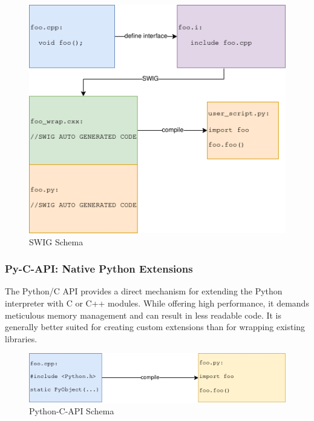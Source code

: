 \begin{figure}[htpb]
    \centering
    \includegraphics[width=\textwidth]{figures/swig_schema.png}
    \caption{SWIG Schema}
    \label{fig:swig-schema}
\end{figure}

\subsubsection{Py-C-API: Native Python Extensions}

The Python/C API provides a direct mechanism for extending the Python interpreter with C or C++ modules. While offering high performance, it demands meticulous memory management and can result in less readable code. It is generally better suited for creating custom extensions than for wrapping existing libraries. \cite{py-c-api}

\begin{figure}[htpb]
    \centering
    \includegraphics[width=\textwidth]{figures/python-C-API_schema.png}
    \caption{Python-C-API Schema}
    \label{fig:py-c-api-schema}
\end{figure}

